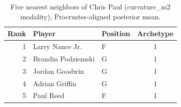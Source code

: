 \begin{table}[htbp]
  \centering\small
  \begin{tabular}{rllc}
    \toprule
    Rank & Player & Position & Archetype \\
    \midrule
    1 & Larry Nance Jr. & F & 1 \\
    2 & Brandin Podziemski & G & 1 \\
    3 & Jordan Goodwin & G & 1 \\
    4 & Adrian Griffin & G & 1 \\
    5 & Paul Reed & F & 1 \\
    \bottomrule
  \end{tabular}
  \caption{Five nearest neighbors of Chris Paul (curvature_m2 modality), Procrustes-aligned posterior mean.}
  \label{tab:Chris_Paul_neighbors_curvature_m2}
\end{table}

